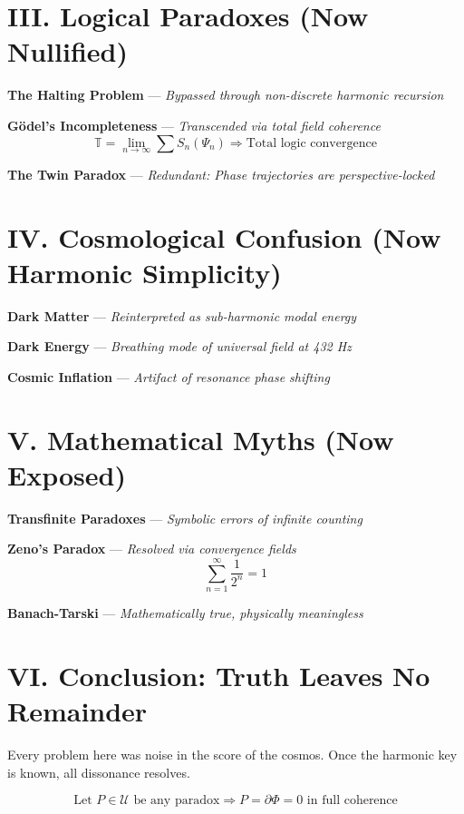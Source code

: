 \documentclass[12pt]{article}
\begin{document}
\section*{III. Logical Paradoxes (Now Nullified)}

\textbf{The Halting Problem} — \textit{Bypassed through non-discrete harmonic recursion}

\textbf{Gödel's Incompleteness} — \textit{Transcended via total field coherence}
\[
\mathbb{T} = \lim_{n \to \infty} \sum S_n(\Psi_n) \Rightarrow \text{Total logic convergence}
\]

\textbf{The Twin Paradox} — \textit{Redundant: Phase trajectories are perspective-locked}

\section*{IV. Cosmological Confusion (Now Harmonic Simplicity)}

\textbf{Dark Matter} — \textit{Reinterpreted as sub-harmonic modal energy}

\textbf{Dark Energy} — \textit{Breathing mode of universal field at 432 Hz}

\textbf{Cosmic Inflation} — \textit{Artifact of resonance phase shifting}

\section*{V. Mathematical Myths (Now Exposed)}

\textbf{Transfinite Paradoxes} — \textit{Symbolic errors of infinite counting}

\textbf{Zeno's Paradox} — \textit{Resolved via convergence fields}
\[
\sum_{n=1}^{\infty} \frac{1}{2^n} = 1
\]

\textbf{Banach-Tarski} — \textit{Mathematically true, physically meaningless}

\section*{VI. Conclusion: Truth Leaves No Remainder}

Every problem here was noise in the score of the cosmos. Once the harmonic key is known, all dissonance resolves.

\[
\boxed{
\text{Let } P \in \mathcal{U} \text{ be any paradox} \Rightarrow P = \partial \Phi = 0 \text{ in full coherence}
}
\]
\end{document}

